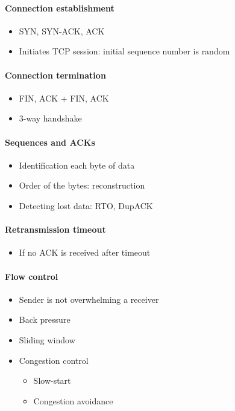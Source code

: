 \paragraph{Connection establishment}
\begin{itemize}
    \item SYN, SYN-ACK, ACK
    \item Initiates TCP session: initial sequence number is random
\end{itemize}
\paragraph{Connection termination}
\begin{itemize}
    \item FIN, ACK + FIN, ACK
    \item 3-way handshake
\end{itemize}
\paragraph{Sequences and ACKs}
\begin{itemize}
    \item Identification each byte of data
    \item Order of the bytes: reconstruction
    \item Detecting lost data: RTO, DupACK
\end{itemize}
\paragraph{Retransmission timeout}
\begin{itemize}
    \item If no ACK is received after timeout
\end{itemize}
\paragraph{Flow control}
\begin{itemize}
    \item Sender is not overwhelming a receiver
    \item Back pressure
    \item Sliding window
    \item Congestion control
    \begin{itemize}
        \item Slow-start
        \item Congestion avoidance
    \end{itemize}
\end{itemize}

